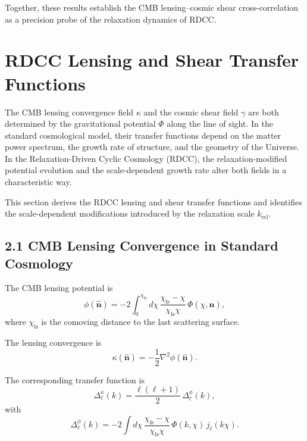 \documentclass[11pt,a4paper]{article}
\begin{document}
Together, these results establish the CMB lensing--cosmic shear cross-correlation as a 
precision probe of the relaxation dynamics of RDCC.

\section{RDCC Lensing and Shear Transfer Functions}

The CMB lensing convergence field $\kappa$ and the cosmic shear field $\gamma$ are both 
determined by the gravitational potential $\Phi$ along the line of sight. In the standard 
cosmological model, their transfer functions depend on the matter power spectrum, the growth 
rate of structure, and the geometry of the Universe. In the Relaxation-Driven Cyclic 
Cosmology (RDCC), the relaxation-modified potential evolution and the scale-dependent growth 
rate alter both fields in a characteristic way.

This section derives the RDCC lensing and shear transfer functions and identifies the 
scale-dependent modifications introduced by the relaxation scale $k_{\mathrm{rel}}$.

\subsection*{2.1 CMB Lensing Convergence in Standard Cosmology}

The CMB lensing potential is
\begin{equation}
    \phi(\hat{\mathbf{n}})
    = -2 \int_{0}^{\chi_{\mathrm{ls}}} d\chi\,
      \frac{\chi_{\mathrm{ls}} - \chi}{\chi_{\mathrm{ls}}\chi}\,
      \Phi(\chi, \hat{\mathbf{n}}),
\end{equation}
where $\chi_{\mathrm{ls}}$ is the comoving distance to the last scattering surface.

The lensing convergence is
\begin{equation}
    \kappa(\hat{\mathbf{n}})
    = -\frac{1}{2}\nabla^{2}\phi(\hat{\mathbf{n}}).
\end{equation}

The corresponding transfer function is
\begin{equation}
    \Delta_{\ell}^{\kappa}(k)
    = \frac{\ell(\ell+1)}{2}\,
      \Delta_{\ell}^{\phi}(k),
\end{equation}
with
\begin{equation}
    \Delta_{\ell}^{\phi}(k)
    = -2 \int d\chi\,
      \frac{\chi_{\mathrm{ls}} - \chi}{\chi_{\mathrm{ls}}\chi}\,
      \Phi(k,\chi)\,
      j_{\ell}(k\chi).
\end{equation}
\end{document}

